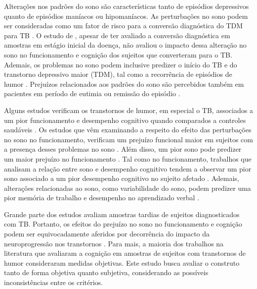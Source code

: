 \documentclass[chapter=TITLE,
               oneside,
               12pt,
               a4paper,
               english,
               brazil]{abntex2}    %
\begin{document}
    Alterações nos padrões do sono são características tanto de episódios depressivos
    quanto de episódios maníacos ou hipomaníacos.
    As perturbações no sono podem ser consideradas como um fator de risco para a
    conversão diagnóstica do TDM para TB
    \parencite{ritter_disturbed_2015}.
    O estudo de \textcite{ritter_disturbed_2015}, apesar de ter avaliado a conversão
    diagnóstica em amostras em estágio inicial da doença, não avaliou o impacto dessa
    alteração no sono no funcionamento e cognição dos sujeitos que converteram para o
    TB.
    Ademais, os problemas no sono podem inclusive predizer o início do TB e do
    transtorno depressivo maior (TDM), tal como a recorrência de episódios de humor
    \parencite{melo_sleep_2016,
    kaplan_sleep_2020,
    andrade-gonzalez_initial_2020}.
    Prejuízos relacionados aos padrões do sono são percebidos também em pacientes
    em período de eutimia ou remissão do episódio
    \parencite{de_la_fuente-tomas_sleep_2018}.

    Alguns estudos verificam os transtornos de humor, em especial o TB, associados
    a um pior funcionamento e desempenho cognitivo quando comparados a controles
    saudáveis
    \parencite{reyes_functional_2017,
    kapczinski_cognition_2016}.
    Os estudos que vêm examinando a respeito do efeito das perturbações no
    sono no funcionamento, verificam um prejuízo funcional maior em sujeitos
    com a presença desses problemas no sono
    \parencite{lai_familiality_2014}.
    Além disso, um pior sono pode
    predizer um maior prejuízo no funcionamento
    \parencite{walz_daytime_2013,
    slyepchenko_association_2019}.
    Tal como no funcionamento, trabalhos que analisam a relação entre
    sono e desempenho cognitivo tendem a observar um pior sono associado
    a um pior desempenho cognitivo no sujeito afetado
    \parencite{russo_relationship_2015,
    kaplan_sleep_2020}.
    Ademais, alterações relacionadas ao sono, como variabilidade do sono,
    podem predizer uma pior memória de trabalho e desempenho no aprendizado
    verbal
    \parencite{kanady_association_2017}.

    Grande parte dos estudos avaliam amostras tardias de sujeitos diagnosticados
    com TB.
    Portanto, os efeitos do prejuízo no sono no funcionamento e cognição podem
    ser equivocadamente aferidos por decorrência do impacto da neuroprogressão
    nos transtornos
    \parencite{tohen_two-year_2000}.
    Para mais, a maioria dos trabalhos na literatura que avaliaram a cognição
    em amostras de sujeitos com transtornos de humor consideraram medidas
    objetivas. Este estudo busca avaliar o construto tanto de forma objetiva
    quanto subjetiva, considerando as possíveis inconsistências entre os critérios.
    
\end{document}
